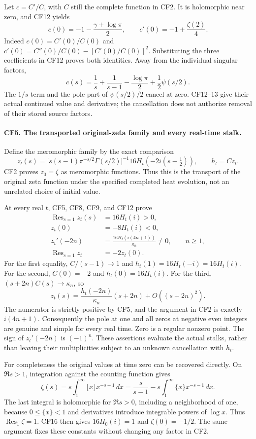 Let \(c=C'/C\), with \(C\) still the complete function in
CF2. It is holomorphic near zero, and CF12 yields
\[
 c(0)=-1-\frac{\gamma+\log\pi}{2},\qquad
 c'(0)=-1+\frac{\zeta(2)}4.
 \tag{CF13}
\]
Indeed \(c(0)=C'(0)/C(0)\) and
\(c'(0)=C''(0)/C(0)-[C'(0)/C(0)]^2\).
Substituting the three coefficients in CF12 proves both
identities. Away from the individual singular factors,
\[
 c(s)=\frac1s+\frac1{s-1}-\frac{\log\pi}{2}
                     +\frac12\psi(s/2).
 \tag{CF14}
\]
The \(1/s\) term and the pole part of
\(\psi(s/2)/2\) cancel at zero. CF12--13 give their actual
continued value and derivative; the cancellation does not
authorize removal of their stored source factors.

\paragraph{CF5. The transported original-zeta family and every real-time stalk.}
Define the meromorphic family by the exact comparison
\[
 z_t(s)=
 \bigl[s(s-1)\pi^{-s/2}\Gamma(s/2)\bigr]^{-1}
       16H_t\!\left(-2i(s-\tfrac12)\right),
 \qquad h_t=Cz_t .
 \tag{CF15}
\]
CF2 proves \(z_0=\zeta\) as meromorphic functions. Thus
this is the transport of the original zeta function under
the specified completed heat evolution, not an unrelated
choice of initial value.

At every real \(t\), CF5, CF8, CF9, and CF12 prove
\[
 \begin{split}
 \operatorname{Res}_{s=1}z_t(s)&=16H_t(i)>0,\\
 z_t(0)&=-8H_t(i)<0,\\
 z_t'(-2n)&=\frac{16H_t(i(4n+1))}{\kappa_n}\ne0,
                 \qquad n\ge1,\\
 \operatorname{Res}_{s=1}z_t&=-2z_t(0).
 \end{split}\tag{CF16}
\]
For the first equality, \(C/(s-1)\to1\) and
\(h_t(1)=16H_t(-i)=16H_t(i)\).
For the second, \(C(0)=-2\) and
\(h_t(0)=16H_t(i)\).
For the third, \((s+2n)C(s)\to\kappa_n\), so
\[
 z_t(s)=\frac{h_t(-2n)}{\kappa_n}(s+2n)
                      +O((s+2n)^2).
 \tag{CF17}
\]
The numerator is strictly positive by CF5, and the
argument in CF2 is exactly \(i(4n+1)\).
Consequently the pole at one and all zeros at negative
even integers are genuine and simple for every real
time. Zero is a regular nonzero point. The sign of
\(z_t'(-2n)\) is \((-1)^n\).
These assertions evaluate the actual stalks, rather than
leaving their multiplicities subject to an unknown
cancellation with \(h_t\).

For completeness the original values at time zero can
be recovered directly. On \(\Re s>1\), integration
against the counting function gives
\[
 \zeta(s)=s\int_1^\infty\lfloor x\rfloor x^{-s-1}\,dx
 =\frac{s}{s-1}-s\int_1^\infty\{x\}x^{-s-1}\,dx .
\]
The last integral is holomorphic for \(\Re s>0\),
including a neighborhood of one, because \(0\le\{x\}<1\)
and derivatives introduce integrable powers of \(\log x\).
Thus \(\operatorname{Res}_1\zeta=1\).
CF16 then gives \(16H_0(i)=1\) and
\(\zeta(0)=-1/2\). The same argument fixes these
constants without changing any factor in CF2.

